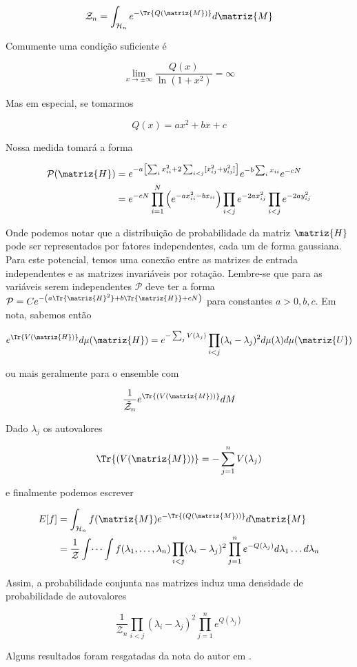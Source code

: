 \[
	\mathcal{Z}_n = \int_{\mathcal{H}_n} e^{-\Tr{Q(\matriz{M})}} d\matriz{M} 
\]

Comumente uma condição suficiente é

\[
	\lim_{x \rightarrow \pm \infty} \frac{Q(x)}{\ln{(1+x^2)}} = \infty
\]

Mas em especial, se tomarmos

\[
	Q(x) = ax^2 + bx + c
\]


Nossa medida tomará a forma

\begin{align}	
	\mathcal{P}(\matriz{H}) & = e^{-a \left[ \sum_{i} x_{ii}^2 + 2 \sum_{i < j} [x_{ij}^2 + y_{ij}^2] \right] } e^{-b \sum_{i} x_{ii}} e^{-c N} \\
	& = e^{-cN} \prod_{i=1}^{N} \left( e^{-ax^2_{ii}-bx_{ii}} \right) \prod_{i<j} e^{-2ax^2_{ij}} \prod_{i<j} e^{-2ay^2_{ij}}
\end{align}

Onde podemos notar que a distribuição de probabilidade da matriz $\matriz{H}$ pode ser representados por fatores independentes, cada um de forma gaussiana. Para este potencial, temos uma conexão entre as matrizes de entrada independentes e as matrizes invariáveis por rotação. Lembre-se que para as variáveis serem independentes $\mathcal{P}$ deve ter a forma $\mathcal{P} = Ce^{-\left( a\Tr{\matriz{H}^2} + b\Tr{\matriz{H}} + cN \right)}$ para constantes $a>0, b, c$. Em nota, sabemos então

\[
e^{\Tr{V(\matriz{H})}}  d\mu(\matriz{H}) = e^{-\sum_{j} V(\lambda_j)}  \prod_{i < j} (\lambda_i - \lambda_j)^2 d\mu(\lambda) d\mu(\matriz{U})
\]

ou mais geralmente para o ensemble com 

\[
	\frac{1}{{\mathcal{\tilde{Z}}}_n} e^{\Tr{(V(\matriz{M}))}} dM
\]

Dado $\lambda_j$ os autovalores

\[
	\Tr{(V(\matriz{M}))} = -\sum_{j=1}^{n} V(\lambda_j)
\]

e finalmente podemos escrever

\begin{align}
	E[f]& = \int_{\mathcal{H}_n} f(\matriz{M}) e^{-\Tr{(Q(\matriz{M}))}} d\matriz{M} \\
	&  = \frac{1}{\mathcal{Z}} \int \dots \int f(\lambda_1, \dots, \lambda_n) \prod_{i < j} (\lambda_i - \lambda_j)^2 \prod_{j=1}^{n} e^{-Q(\lambda_j)} d\lambda_1 \dots d\lambda_n
\end{align}

Assim, a probabilidade conjunta nas matrizes induz uma densidade de probabilidade de autovalores

\begin{equation}
	\frac{1}{\mathcal{Z}_n} \prod_{i<j} (\lambda_i - \lambda_j)^2 \prod_{j=1}^{n} e^{Q(\lambda_j)}
	\label{eq: weyl}
\end{equation}

Alguns resultados foram resgatadas da nota do autor em \cite{ArnoLectureNotes}.{\tiny }